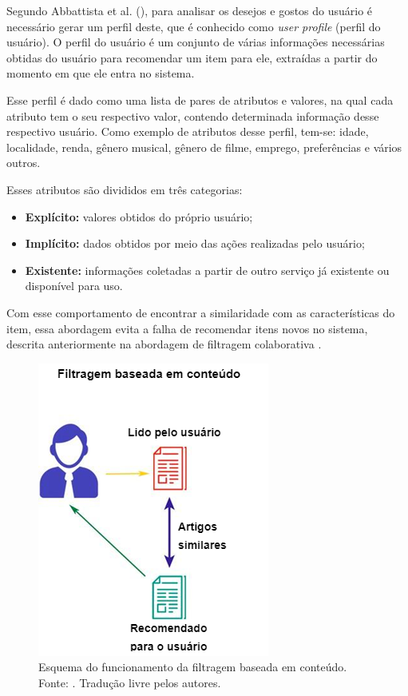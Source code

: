 Segundo Abbattista et al. (\citeyear{Abbattista:2002}), para analisar os desejos e gostos do usuário é necessário gerar um perfil deste, que é conhecido como \textit{user profile} (perfil do usuário). O perfil do usuário é um conjunto de várias informações necessárias obtidas do usuário para recomendar um item para ele, extraídas a partir do momento em que ele entra no sistema.

Esse perfil é dado como uma lista de pares de atributos e valores, na qual cada atributo tem o seu respectivo valor, contendo determinada informação desse respectivo usuário. Como exemplo de atributos desse perfil, tem-se: idade, localidade, renda, gênero musical, gênero de filme, emprego, preferências e vários outros.

Esses atributos são divididos em três categorias:
\begin{itemize}
    \item \textbf{Explícito:} valores obtidos do próprio usuário;

    \item \textbf{Implícito:} dados obtidos por meio das ações realizadas pelo usuário;

    \item \textbf{Existente:} informações coletadas a partir de outro serviço já existente ou disponível para uso.
\end{itemize}

Com esse comportamento de encontrar a similaridade com as características do item, essa abordagem evita a falha de recomendar itens novos no sistema, descrita anteriormente na abordagem de filtragem colaborativa \cite{Luk:2019}.

\begin{figure}[H]
    \centering
    \includegraphics[scale=0.7]{figuras/referencial_teorico/content_based.png}
    \caption[Esquema do funcionamento da filtragem baseada em conteúdo]{Esquema do funcionamento da filtragem baseada em conteúdo. Fonte: \cite{Jain:2019}. Tradução livre pelos autores.}
    \label{fig:content_based}
\end{figure}

